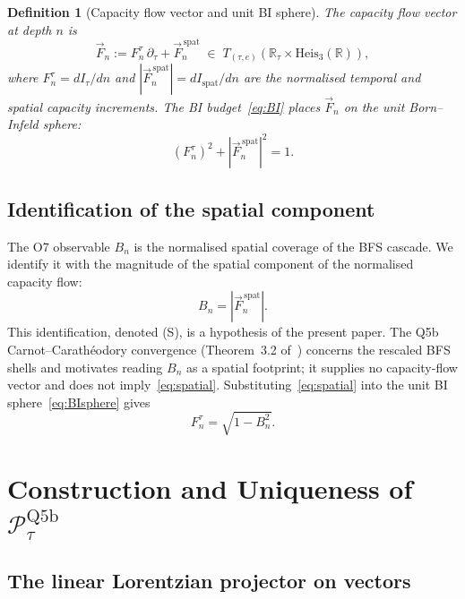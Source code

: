\documentclass[11pt,a4paper]{article}
\newtheorem{definition}[theorem]{Definition}
\begin{document}
      \begin{definition}[Capacity flow vector and unit BI sphere]\label{def:BIsphere}
        The \emph{capacity flow vector} at depth $n$ is
        \[
          \vec{F}_n := F_n^\tau\,\partial_\tau + \vec{F}_n^{\,\mathrm{spat}}
          \;\in\; T_{(\tau,e)}(\mathbb{R}_\tau \times \mathrm{Heis}_3(\mathbb{R})),
        \]
        where $F_n^\tau = dI_\tau/dn$ and $|\vec{F}_n^{\,\mathrm{spat}}| = dI_{\mathrm{spat}}/dn$
        are the normalised temporal and spatial capacity increments.
        The BI budget~\eqref{eq:BI} places $\vec{F}_n$ on the \emph{unit Born--Infeld sphere}:
        \begin{equation}\label{eq:BIsphere}
          (F_n^\tau)^2 + |\vec{F}_n^{\,\mathrm{spat}}|^2 = 1.
        \end{equation}
      \end{definition}

    \subsection{Identification of the spatial component}\label{sec:spatialid}

      The O7 observable $B_n$ is the normalised spatial coverage of the BFS cascade.
      We identify it with the magnitude of the spatial component of the normalised capacity flow:
      \begin{equation}\label{eq:spatial}
        B_n = |\vec{F}_n^{\,\mathrm{spat}}|.
      \end{equation}
      This identification, denoted (S), is a hypothesis of the present paper.
      The Q5b Carnot--Carath\'eodory convergence (Theorem~3.2 of~\cite{Beau2026q5b}) concerns the rescaled BFS
      shells and motivates reading $B_n$ as a spatial footprint; it supplies no capacity-flow vector and does not
      imply~\eqref{eq:spatial}.
      Substituting~\eqref{eq:spatial} into the unit BI sphere~\eqref{eq:BIsphere} gives
      \begin{equation}\label{eq:Ftau}
        F_n^\tau = \sqrt{1 - B_n^2}.
      \end{equation}

  \section{Construction and Uniqueness of $\mathcal{P}_\tau^{\mathrm{Q5b}}$}
    \label{sec:construction}

    \subsection{The linear Lorentzian projector on vectors}
\end{document}
